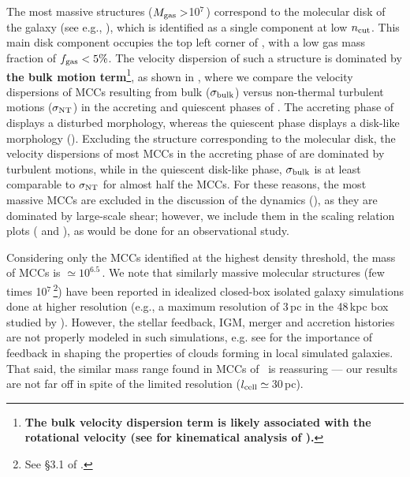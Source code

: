 \IfFileExists{emulateapjlegacy.cls}{\documentclass[iop]{emulateapjlegacy}}{\documentclass[iop]{emulateapj}}
\begin{document}
The most massive structures ($M_{\rm gas}>$10$^7$\,\Msun) correspond to the molecular disk of the galaxy (see e.g., ), which is identified as a single component at low $n_{\rm cut}$. This main disk component occupies the top left corner of , with a low gas mass fraction of $f_{\rm gas}< 5\%$. The velocity dispersion of such a structure is dominated by 
{\bf the bulk motion term}\footnote{{\bf The bulk velocity dispersion term is likely associated with the rotational velocity (see \citealt{Kohandel19a} for kinematical analysis of \flower).}}, as shown in , where we compare the velocity dispersions of MCCs resulting from bulk ($\sigma_{\rm bulk}$) versus non-thermal turbulent motions ($\sigma_{\rm NT}$) in the accreting and quiescent phases of \flower. The accreting phase of \flower displays a disturbed morphology, whereas the quiescent phase displays a disk-like morphology (). 
%
Excluding the structure corresponding to the molecular disk, the velocity dispersions of most MCCs in the accreting phase of \flower are dominated by turbulent motions, while  in the quiescent disk-like phase, $\sigma_{\rm bulk}$ is at least comparable to $\sigma_{\rm NT}$ for almost half the MCCs.
%
For these reasons, the most massive MCCs are excluded in the discussion of the dynamics (), as they are dominated by large-scale shear; however, we include them in the scaling relation plots ( and ), as would be done for an observational study.

Considering only the MCCs identified at the highest density threshold, the mass of MCCs is $\simeq10^{6.5}$\,\Msun. We note that similarly massive molecular structures (few times 10$^7$\,\Msun\footnote{See \S{3.1} of \citet{Behrendt16a}.}) have been reported in idealized closed-box isolated galaxy simulations done at higher resolution (e.g., a maximum resolution of 3\,pc in the 48\,kpc box studied by \citealt{Behrendt16a}). However, the stellar feedback, IGM, merger and accretion histories are not properly modeled in such simulations, e.g. see \citet{grisdale:2017,grisdale:2019} for the importance of feedback in shaping the properties of clouds forming in local simulated galaxies. That said, the similar mass range found in MCCs of \flower\ is reassuring --- our results are not far off in spite of the limited resolution ($l_{\rm cell}\simeq$\,30\,pc).
\end{document}

